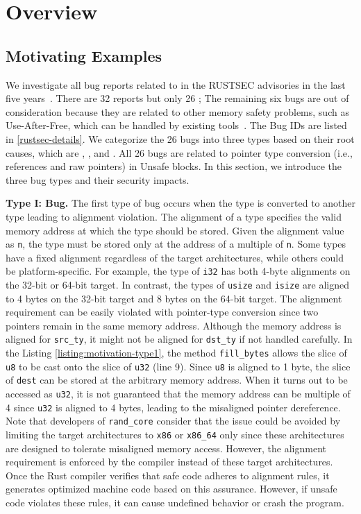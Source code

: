 \section{Overview}

\subsection{Motivating Examples}
\label{sec:ty-bug}
We investigate all bug reports related to  in the RUSTSEC advisories in the last five years~\cite{rustsec}. There are 32 reports but only 26 \bugs; The remaining six bugs are out of consideration because they are related to other memory safety problems, such as Use-After-Free, which can be handled by existing tools~\cite{Qin2020ReplicationPF, Yechan2021Rudra, Zhuohua2021MirChecker, safedrop}. The Bug IDs are listed in \autoref{rustsec-details}. We categorize the 26 bugs into three types based on their root causes, which are \bone, \btwo, and \bthree. All 26 bugs are related to pointer type conversion (i.e., references and raw pointers) in Unsafe blocks. In this section, we introduce the three bug types and their security impacts.


\vspace{0.05in}
\noindent\textbf{Type I: \Bone Bug.} The first type of bug occurs when the type is converted to another type leading to alignment violation. The alignment of a type specifies the valid memory address at which the type should be stored.  Given the alignment value as \texttt{n}, the type must be stored only at the address of a multiple of \texttt{n}. Some types have a fixed alignment regardless of the target architectures, while others could be platform-specific.  For example, the type of \texttt{i32} has both 4-byte alignments on the 32-bit or 64-bit target. In contrast, the types of \texttt{usize} and \texttt{isize} are aligned to 4 bytes on the 32-bit target and 8 bytes on the 64-bit target. The alignment requirement can be easily violated with pointer-type conversion since two pointers remain in the same memory address. Although the memory address is aligned for \texttt{src\_ty}, it might not be aligned for \texttt{dst\_ty} if not handled carefully. In the Listing \ref{listing:motivation-type1}, the method \texttt{fill\_bytes} allows the slice of \texttt{u8} to be cast onto the slice of \texttt{u32} (line 9). Since \texttt{u8} is aligned to 1 byte, the slice of \texttt{dest} can be stored at the arbitrary memory address. When it turns out to be accessed as \texttt{u32}, it is not guaranteed that the memory address can be multiple of 4 since \texttt{u32} is aligned to 4 bytes, leading to the misaligned pointer dereference. Note that developers of \texttt{rand\_core} consider that the issue could be avoided by limiting the target architectures to \texttt{x86} or \texttt{x86\_64} only since these architectures are designed to tolerate misaligned memory access. However, the alignment requirement is enforced by the compiler instead of these target architectures. Once the Rust compiler verifies that safe code adheres to alignment rules, it generates optimized machine code based on this assurance. However, if unsafe code violates these rules, it can cause undefined behavior or crash the program.



